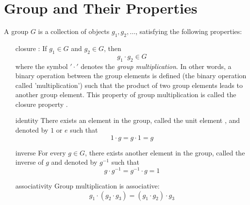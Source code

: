 

\chapter{Group and Their Properties}
\label{appendix4.group}

 A group $G$ is a collection of objects $g_1,g_2,\ldots$, satisfying the following properties:
 \begin{enumerate}
 	\item[closure]: If $g_1 \in G$ and $g_2 \in G$, then
 	\begin{equation}
	 	g_1 \cdot g_2 \in G
 	\end{equation}
 	where the symbol $'\cdot'$ denotes the \textit{group multiplication}. In other words, a binary operation between the group elements is defined (the binary operation called 'multiplication') such that the product of two group elements leads to another group element. This property of group multiplication is called the closure property .
 	
 	
 	
 	
 	\item[identity] There exists an element in the group, called the unit element , and denoted by $1$ or $e$ such that
 	\begin{equation}
	 	1 \cdot g = g \cdot 1 = g
 	\end{equation}
 	
 	
 	
 	
 	\item[inverse] For every $g\in G$, there exists another element in the group, called the inverse  of $g$ and denoted by $g^{-1}$ such that
 	\begin{equation}
	 	g\cdot g^{-1} = g^{-1}\cdot g = 1
 	\end{equation}
 	
 	
 	\item[associativity] Group multiplication is associative:
 	\begin{equation}
	 	g_1 \cdot (g_2 \cdot g_3) = (g_1 \cdot g_2) \cdot g_3
 	\end{equation}
 \end{enumerate}